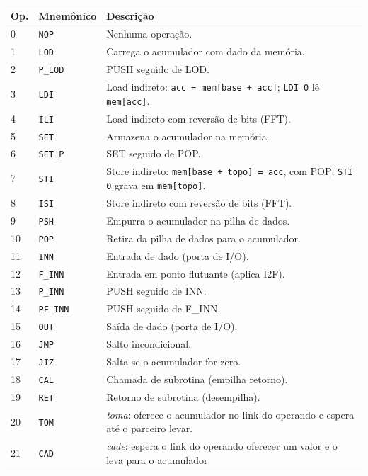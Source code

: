 \begin{longtable}{l l l}
\toprule
\textbf{Op.} & \textbf{Mnemônico} & \textbf{Descrição} \\
\midrule
\endhead
0  & \lstinline|NOP|    & Nenhuma operação. \\
1  & \lstinline|LOD|    & Carrega o acumulador com dado da memória. \\
2  & \lstinline|P_LOD|  & PUSH seguido de LOD. \\
3  & \lstinline|LDI|    & Load indireto: \lstinline|acc = mem[base + acc]|; \lstinline|LDI 0| lê \lstinline|mem[acc]|. \\
4  & \lstinline|ILI|    & Load indireto com reversão de bits (FFT). \\
5  & \lstinline|SET|    & Armazena o acumulador na memória. \\
6  & \lstinline|SET_P|  & SET seguido de POP. \\
7  & \lstinline|STI|    & Store indireto: \lstinline|mem[base + topo] = acc|, com POP; \lstinline|STI 0| grava em \lstinline|mem[topo]|. \\
8  & \lstinline|ISI|    & Store indireto com reversão de bits (FFT). \\
9  & \lstinline|PSH|    & Empurra o acumulador na pilha de dados. \\
10 & \lstinline|POP|    & Retira da pilha de dados para o acumulador. \\
11 & \lstinline|INN|    & Entrada de dado (porta de I/O). \\
12 & \lstinline|F_INN|  & Entrada em ponto flutuante (aplica I2F). \\
13 & \lstinline|P_INN|  & PUSH seguido de INN. \\
14 & \lstinline|PF_INN| & PUSH seguido de F\_INN. \\
15 & \lstinline|OUT|    & Saída de dado (porta de I/O). \\
16 & \lstinline|JMP|    & Salto incondicional. \\
17 & \lstinline|JIZ|    & Salta se o acumulador for zero. \\
18 & \lstinline|CAL|    & Chamada de subrotina (empilha retorno). \\
19 & \lstinline|RET|    & Retorno de subrotina (desempilha). \\
20 & \lstinline|TOM|    & \emph{toma}: oferece o acumulador no link do operando e espera até o parceiro levar. \\
21 & \lstinline|CAD|    & \emph{cade}: espera o link do operando oferecer um valor e o leva para o acumulador. \\
\bottomrule
\end{longtable}

